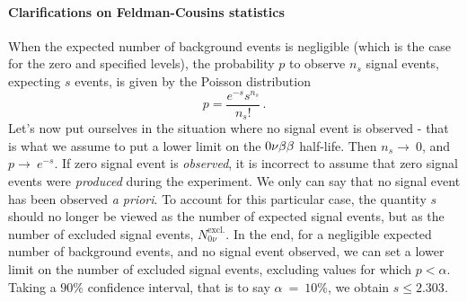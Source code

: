 \paragraph{Clarifications on Feldman-Cousins statistics}
When the expected number of background events is negligible (which is the case for the zero and specified levels), the probability $p$ to observe $n_{s}$ signal events, expecting $s$ events, is given by the Poisson distribution
\begin{equation}
p = \frac{e^{-s}s^{n_{s}}}{n_{s}!}\,.
\end{equation}
Let's now put ourselves in the situation where no signal event is observed - that is what we assume to put a lower limit on the $0\nu\beta\beta$ half-life.
Then $n_{s}\rightarrow~0$, and $p\rightarrow~e^{-s}$.
If zero signal event is \emph{observed}, it is incorrect to assume that zero signal events were \emph{produced} during the experiment.
We only can say that no signal event has been observed \emph{a priori}.
To account for this particular case, the quantity $s$ should no longer be viewed as the number of expected signal events, but as the number of excluded signal events, $N_{0\nu}^{\text{excl.}}$.
In the end, for a negligible expected number of background events, and no signal event observed, we can set a lower limit on the number of excluded signal events, excluding values for which $p < \alpha$.
Taking a $90\%$ confidence interval, that is to say $\alpha~=~10\%$, we obtain $s \leq 2.303$.

